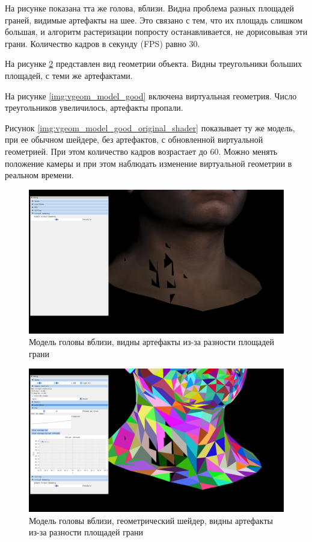 На рисунке показана тта же голова, вблизи. Видна проблема разных площадей граней, видимые артефакты на шее.
Это связано с тем, что их площадь слишком большая, и алгоритм растеризации попросту останавливается, не дорисовывая эти грани.
Количество кадров в секунду (FPS) равно 30.

На рисунке \ref{img:vgeom_model_bad} представлен вид геометрии объекта. Видны треугольники больших площадей, с теми же артефактами.

На рисунке \ref{img:vgeom_model_good} включена виртуальная геометрия. Число треугольников увеличилось, артефакты  пропали.

Рисунок \ref{img:vgeom_model_good_original_shader} показывает ту же модель, при ее обычном шейдере, без артефактов, с обновленной виртуальной геометрией.
При этом количество кадров возрастает до 60. Можно менять положение камеры и при этом наблюдать изменение виртуальной геометрии в реальном времени. 

\begin{figure}[H]
	\begin{center}
		\includegraphics[scale=0.3]{img/i5.png}
	\end{center}
	\captionsetup{justification=centering}
	\caption{Модель головы вблизи, видны артефакты из-за разности площадей грани} 
	\label{img:vgeom_original_model_bad}
\end{figure}

\begin{figure}[H]
	\begin{center}
		\includegraphics[scale=0.3]{img/vgeom_view_bad.png}
	\end{center}
	\captionsetup{justification=centering}
	\caption{Модель головы вблизи, геометрический шейдер, видны артефакты из-за разности площадей грани} 
	\label{img:vgeom_model_bad}
\end{figure}


